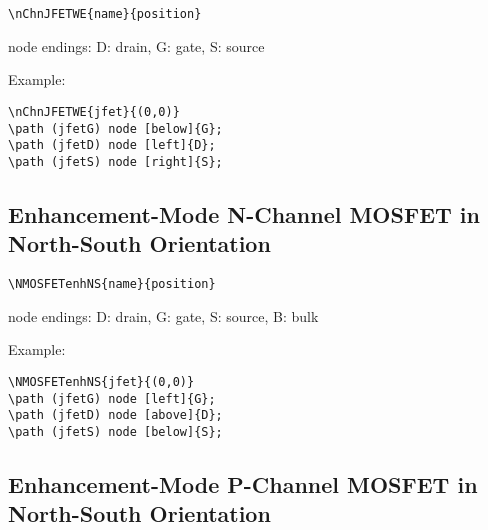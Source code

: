 \documentclass[parskip=full]{scrartcl}
\begin{document}
\begin{verbatim}
\nChnJFETWE{name}{position}
\end{verbatim}
node endings: D: drain, G: gate, S: source

Example:\\
\begin{minipage}{0.8\textwidth}
\begin{verbatim}
\nChnJFETWE{jfet}{(0,0)}
\path (jfetG) node [below]{G};
\path (jfetD) node [left]{D};
\path (jfetS) node [right]{S};
\end{verbatim}
\end{minipage}
\begin{minipage}{0.19\textwidth}
\end{minipage}

\subsection{Enhancement-Mode N-Channel MOSFET in North-South Orientation}

\begin{verbatim}
\NMOSFETenhNS{name}{position}
\end{verbatim}
node endings: D: drain, G: gate, S: source, B: bulk

Example:\\
\begin{minipage}{0.8\textwidth}
\begin{verbatim}
\NMOSFETenhNS{jfet}{(0,0)}
\path (jfetG) node [left]{G};
\path (jfetD) node [above]{D};
\path (jfetS) node [below]{S};
\end{verbatim}
\end{minipage}
\begin{minipage}{0.19\textwidth}
\end{minipage}

\subsection{Enhancement-Mode P-Channel MOSFET in North-South Orientation}
\end{document}

